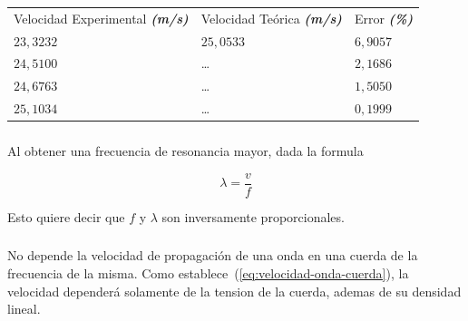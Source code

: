 \documentclass[twocolumn, 12pt]{article}
\newcommand{\bolditalic}[1]{\textbf{\textit{#1}}}
\begin{document}
\vspace{-.5cm}

\begin{table}[H]
    \begin{tabularx}{0.9\linewidth}{|>{\centering\arraybackslash}X|>{\centering\arraybackslash}X|>{\centering\arraybackslash}X|}
        \multicolumn{3}{c}{\large $M_{3}$}                                                                         \\\hline
        Velocidad Experimental \bolditalic{(m/s)} & Velocidad Teórica \bolditalic{(m/s)} & Error \bolditalic{(\%)} \\\hline
        $23,3232$                                 & $25,0533$                            & $6,9057$                \\\hline
        $24,5100$                                 & \dots                                & $2,1686$                \\\hline
        $24,6763$                                 & \dots                                & $1,5050$                \\\hline
        $25,1034$                                 & \dots                                & $0,1999$                \\\hline
    \end{tabularx}
\end{table}

\subsubsection{}

Al obtener una frecuencia de resonancia mayor, dada la
formula

\begin{equation*}
    \lambda = \frac{v}{f}
\end{equation*}

Esto quiere decir que $f$ y $\lambda$ son inversamente
proporcionales.

\subsubsection{}

No depende la velocidad de propagación de una onda en una
cuerda de la frecuencia de la misma. Como
establece~(\ref{eq:velocidad-onda-cuerda}), la velocidad
dependerá solamente de la tension de la cuerda, ademas de
su densidad lineal.
\end{document}
